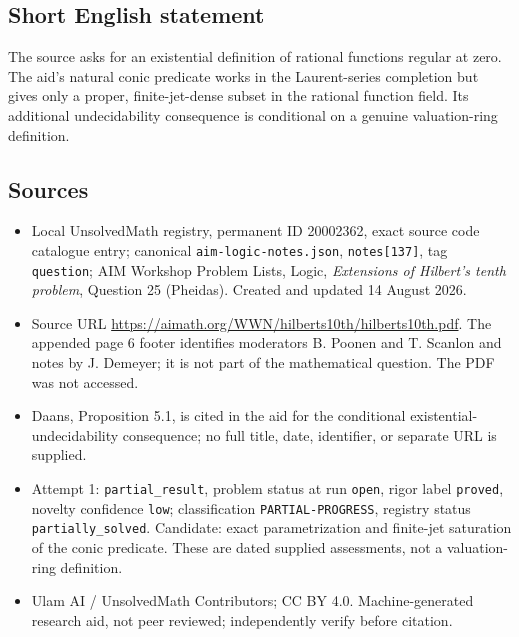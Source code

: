 \documentclass[11pt]{article}
\begin{document}
\subsection{Short English statement}
The source asks for an existential definition of rational functions regular at zero. The aid's natural conic predicate works in the Laurent-series completion but gives only a proper, finite-jet-dense subset in the rational function field. Its additional undecidability consequence is conditional on a genuine valuation-ring definition.
\subsection{Sources}
\begin{itemize}
\item Local UnsolvedMath registry, permanent ID 20002362, exact source code catalogue entry; canonical \texttt{aim-logic-notes.json}, \texttt{notes[137]}, tag \texttt{question}; AIM Workshop Problem Lists, Logic, \emph{Extensions of Hilbert's tenth problem}, Question 25 (Pheidas). Created and updated 14 August 2026.
\item Source URL \url{https://aimath.org/WWN/hilberts10th/hilberts10th.pdf}. The appended page 6 footer identifies moderators B. Poonen and T. Scanlon and notes by J. Demeyer; it is not part of the mathematical question. The PDF was not accessed.
\item Daans, Proposition 5.1, is cited in the aid for the conditional existential-undecidability consequence; no full title, date, identifier, or separate URL is supplied.
\item Attempt 1: \texttt{partial\_result}, problem status at run \texttt{open}, rigor label \texttt{proved}, novelty confidence \texttt{low}; classification \texttt{PARTIAL-PROGRESS}, registry status \texttt{partially\_solved}. Candidate: exact parametrization and finite-jet saturation of the conic predicate. These are dated supplied assessments, not a valuation-ring definition.
\item Ulam AI / UnsolvedMath Contributors; CC BY 4.0. Machine-generated research aid, not peer reviewed; independently verify before citation.
\end{itemize}
\end{document}
